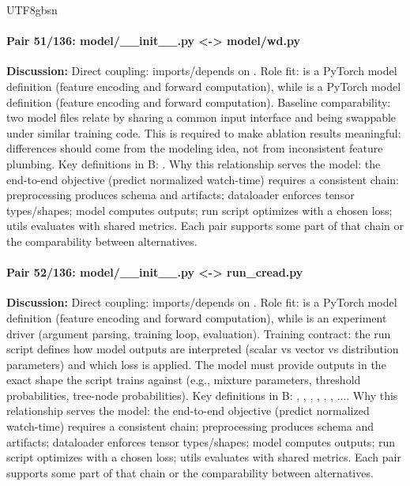 \documentclass[11pt]{article}
\begin{document}
\begin{CJK*}{UTF8}{gbsn}
\paragraph{Pair 51/136: model/\_\_init\_\_.py <-> model/wd.py}
\textbf{Discussion:} Direct coupling: \texttt{} imports/depends on \texttt{}. Role fit: \texttt{} is a PyTorch model definition (feature encoding and forward computation), while \texttt{} is a PyTorch model definition (feature encoding and forward computation). Baseline comparability: two model files relate by sharing a common input interface and being swappable under similar training code. This is required to make ablation results meaningful: differences should come from the modeling idea, not from inconsistent feature plumbing. Key definitions in B: \texttt{}. Why this relationship serves the model: the end-to-end objective (predict normalized watch-time) requires a consistent chain: preprocessing produces schema and artifacts; dataloader enforces tensor types/shapes; model computes outputs; run script optimizes with a chosen loss; utils evaluates with shared metrics. Each pair supports some part of that chain or the comparability between alternatives.

\paragraph{Pair 52/136: model/\_\_init\_\_.py <-> run\_cread.py}
\textbf{Discussion:} Direct coupling: \texttt{} imports/depends on \texttt{}. Role fit: \texttt{} is a PyTorch model definition (feature encoding and forward computation), while \texttt{} is an experiment driver (argument parsing, training loop, evaluation). Training contract: the run script defines how model outputs are interpreted (scalar vs vector vs distribution parameters) and which loss is applied. The model must provide outputs in the exact shape the script trains against (e.g., mixture parameters, threshold probabilities, tree-node probabilities). Key definitions in B: \texttt{}, \texttt{}, \texttt{}, \texttt{}, \texttt{}, \texttt{}, .... Why this relationship serves the model: the end-to-end objective (predict normalized watch-time) requires a consistent chain: preprocessing produces schema and artifacts; dataloader enforces tensor types/shapes; model computes outputs; run script optimizes with a chosen loss; utils evaluates with shared metrics. Each pair supports some part of that chain or the comparability between alternatives.


\end{CJK*}
\end{document}
